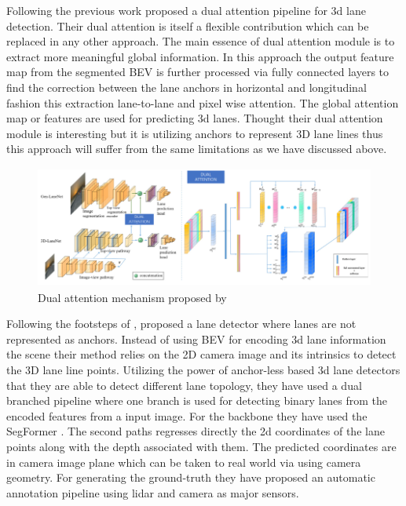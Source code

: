 Following the previous work \cite{9506296} proposed a dual attention pipeline for 3d lane detection. Their dual attention is itself a flexible contribution which can be replaced in any other approach. The main essence of dual attention module is to extract more meaningful global information. In this approach the output feature map from the segmented BEV is further processed via fully connected layers to find the correction between the lane anchors in horizontal and longitudinal fashion this extraction lane-to-lane and pixel wise attention. The global attention map or features are used for predicting 3d lanes. Thought their dual attention module is interesting but it is utilizing anchors to represent 3D lane lines thus this approach will suffer from the same limitations as we have discussed above. 

 \begin{figure}[h]
    \centering
\includegraphics[width=12cm, height=4cm]{images/dual_attention_pipeline.png}
    \caption{Dual attention mechanism  proposed by  \cite{9506296}}
    \end{figure}

Following the footsteps of \cite{DBLP:journals/corr/abs-2011-01535}, \cite{yan2022once} proposed a lane detector where lanes are not represented as anchors. Instead of using BEV for encoding 3d lane information the scene their method relies on the 2D camera image and its intrinsics to detect the 3D lane line points. Utilizing the power of anchor-less based 3d lane detectors that they are able to detect different lane topology, they have used a dual branched pipeline where one branch is used for detecting binary lanes from the encoded features from a input image. For the backbone they have used the SegFormer \cite{DBLP:journals/corr/abs-2105-15203}. The second paths regresses directly the 2d coordinates of the lane points along with the depth associated with them. The predicted coordinates are in camera image plane which can be taken to real world via using camera geometry. For generating the ground-truth they have proposed an automatic annotation pipeline using lidar and camera as major sensors.

